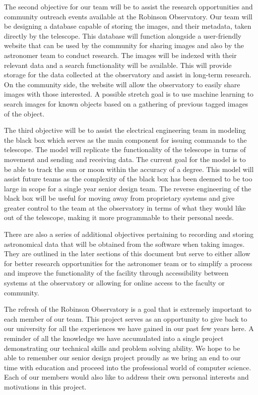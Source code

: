 \documentclass[12pt]{report}
\begin{document}
The second objective for our team will be to assist the research opportunities  and community outreach events available at the Robinson Observatory.  Our team will be designing a database capable of storing the images, and their metadata, taken directly by the telescope.  This database will function alongside a user-friendly website that can be used by the community for sharing images and also by the astronomer team to conduct research.  The images will be indexed with their relevant data and a search functionality will be available.  This will provide storage for the data collected at the observatory and assist in long-term research.  On the community side, the website will allow the observatory to easily share images with those interested.  A possible stretch goal is to use machine learning to search images for known objects based on a gathering of previous tagged images of the object.

The third objective will be to assist the electrical engineering team in modeling the black box which serves as the main component for issuing commands to the telescope.  The model will replicate the functionality of the telescope in turns of movement and sending and receiving data.  The current goal for the model is to be able to track the sun or moon within the accuracy of a degree.  This model will assist future teams as the complexity of the black box has been deemed to be too large in scope for a single year senior design team.  The reverse engineering of the black box will be useful for moving away from proprietary systems and give greater control to the team at the observatory in terms of what they would like out of the telescope, making it more programmable to their personal needs.

There are also a series of additional objectives pertaining to recording and storing astronomical data that will be obtained from the software when taking images.  They are outlined in the later sections of this document but serve to either allow for better research opportunities for the astronomer team or to simplify a process and improve the functionality of the facility through accessibility between systems at the observatory or allowing for online access to the faculty or community.

The refresh of the Robinson Observatory is a goal that is extremely important to each member of our team.  This project serves as an opportunity to give back to our university for all the experiences we have gained in our past few years here.  A reminder of all the knowledge we have accumulated into a single project demonstrating our technical skills and problem solving ability.  We hope to be able to remember our senior design project proudly as we bring an end to our time with education and proceed into the professional world of computer science.  Each of our members would also like to address their own personal interests and motivations in this project.
\end{document}
